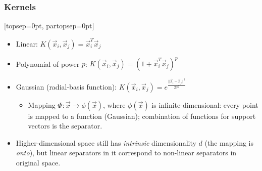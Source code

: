 \subsubsection{Kernels}[topsep={0pt}, partopsep={0pt}]
\begin{itemize}
    \item Linear: \(K(\vec{x}_i,\vec{x}_j) = \vec{x}_i^T\vec{x}_j\)\\
    \item Polynomial of power \(p\): \(K(\vec{x}_i,\vec{x}_j) = (1 + \vec{x}_i^T \vec{x}_j)^p\)\\
    \item Gaussian (radial-basis function): \(K(\vec{x}_i,\vec{x}_j) = e^{\frac {||\vec{x}_i - \vec{x}_j||^2} {2 \sigma^2}}\)\\
        \begin{itemize}
        \item Mapping \(\Phi: \vec{x} \to \phi(\vec{x})\), where \(\phi(\vec{x})\) is infinite-dimensional: every point is mapped to a function (Gaussian); combination of functions for support vectors is the separator.\\
        \end{itemize}
    \item Higher-dimensional space still has \emph{intrinsic} dimensionality \(d\) (the mapping is \emph{onto}), but linear separators in it correspond to non-linear separators in original space.
\end{itemize}